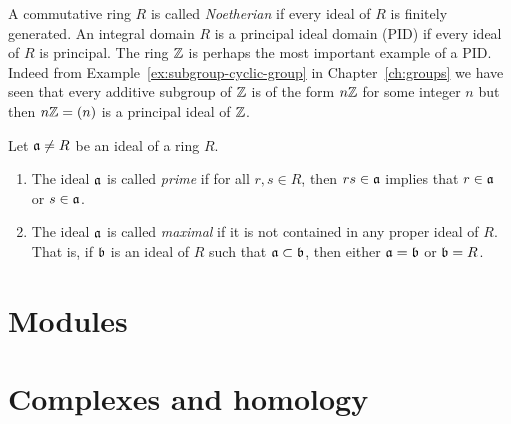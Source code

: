 A commutative ring \(R\) is called \emph{Noetherian} if every ideal of \(R\) is
finitely generated. An integral domain \(R\) is a principal ideal domain (PID)
if every ideal of \(R\) is principal. The ring \(\mathbb{Z}\) is perhaps the most
important example of a PID. Indeed from Example~\ref{ex:subgroup-cyclic-group}
in Chapter~\ref{ch:groups} we have seen that every additive subgroup of \(\mathbb{Z}\)
is of the form \(n\mathbb{Z}\) for some integer \(n\) but then \(n\mathbb{Z} = (n)\) is a
principal ideal of \(\mathbb{Z}\).



\begin{definition}
    Let \(\mathfrak{a} \neq R\) be an ideal of a ring \(R\).

    \begin{enumerate}[label=(\alph*), wide]
        \item The ideal \(\mathfrak{a}\) is called \emph{prime} if for all \(r, s \in R\), then \(rs \in \mathfrak{a}\) implies that \(r \in \mathfrak{a}\) or \(s \in \mathfrak{a}\).
        \item The ideal \(\mathfrak{a}\) is called \emph{maximal} if it is not contained in any proper ideal of \(R\). That is, if \(\mathfrak{b}\) is an ideal of \(R\) such that \(\mathfrak{a} \subset \mathfrak{b}\), then either \(\mathfrak{a} = \mathfrak{b}\) or \(\mathfrak{b} = R\).
    \end{enumerate}
\end{definition}

\section{Modules}

\section{Complexes and homology}